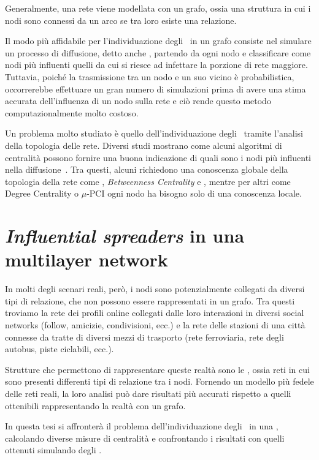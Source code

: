Generalmente, una rete viene modellata con un grafo, ossia una struttura in cui i 
nodi sono connessi da un arco se tra loro esiste una relazione.

Il modo più affidabile per l'individuazione degli \infsp\ in un grafo consiste nel 
simulare un processo di diffusione, detto anche \spproc, partendo da ogni nodo e 
classificare come nodi più 
influenti quelli da cui si riesce ad infettare la porzione di rete maggiore.
Tuttavia, poiché la trasmissione tra un nodo e un suo vicino è probabilistica,
occorrerebbe effettuare un gran numero di simulazioni prima di avere una stima accurata 
dell'influenza di un nodo sulla rete e ciò rende questo metodo computazionalmente 
molto costoso.

Un problema molto studiato è quello dell'individuazione degli \infsp\ tramite l'analisi della 
topologia delle rete.
Diversi studi mostrano come alcuni algoritmi di centralità possono fornire una buona indicazione di 
quali sono i nodi più influenti nella diffusione~\cite{kitsak:infsp}\cite{basaras:infsp}\cite{pei:infsp}.
Tra questi, alcuni richiedono una conoscenza globale della topologia della rete come
\PageRank, \textit{Betweenness Centrality} e \kcore, 
mentre per altri come Degree Centrality o $\mu$-PCI ogni nodo 
ha bisogno solo di una conoscenza locale.

\section{\textit{Influential spreaders} in una multilayer network}

In molti degli scenari reali, però, i nodi sono potenzialmente collegati da diversi tipi di relazione, che non 
possono essere rappresentati in un grafo. 
Tra questi troviamo la rete dei profili online collegati dalle loro interazioni
in diversi social networks (follow, amicizie, condivisioni, ecc.) e la rete delle stazioni di 
una città connesse da tratte di diversi mezzi di trasporto (rete ferroviaria, rete degli autobus, 
piste ciclabili, ecc.).

Strutture che permettono di rappresentare queste realtà sono le \mulns, ossia reti in cui sono 
presenti differenti tipi di relazione tra i nodi. Fornendo un modello più fedele 
delle reti reali, la loro analisi può dare risultati più accurati rispetto 
a quelli ottenibili rappresentando la realtà con un grafo.

In questa tesi si affronterà il problema dell'individuazione degli \infsp\ in 
una \muln, calcolando diverse misure di centralità e confrontando i 
risultati con quelli ottenuti simulando degli \spprocs.

